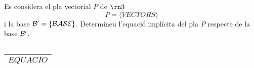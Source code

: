 \begin{enunciat}
Es considera el pla vectorial $P$ de $\rn 3$
\[
  P = \langle VECTORS \rangle
\]
i la base $\cal B'=\{BASE\}$. Determineu l'equació implícita del pla $P$ respecte de la base $\cal B'$.
\end{enunciat}

\begin{quadricula}
\begin{tabular}{|C{5cm}{0.5cm}|}
\hline
 \\
\hline
\end{tabular}
\end{quadricula}

\begin{solucio}
\begin{center}
\begin{tabular}{|C{5cm}{0.5cm}|}
\hline
$EQUACIO$ \\
\hline
\end{tabular}
\end{center}
\end{solucio}
